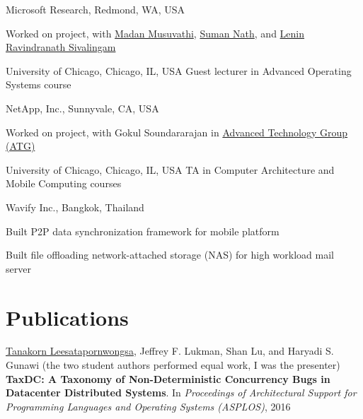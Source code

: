 \documentclass[10pt]{article} %
\begin{document}
{Microsoft Research, Redmond, WA, USA}
{\begin{minipage}{\smallertextwidth}
Worked on  project,
with \href{https://www.microsoft.com/en-us/research/people/madanm/}{Madan Musuvathi}, 
\href{https://www.microsoft.com/en-us/research/people/sumann/}{Suman Nath}, 
and \href{http://people.csail.mit.edu/lenin/}{Lenin Ravindranath Sivalingam}
\end{minipage}} 

{University of Chicago, Chicago, IL, USA}
{Guest lecturer in Advanced Operating Systems course} 

{NetApp, Inc., Sunnyvale, CA, USA}
{\begin{minipage}{\smallertextwidth}
Worked on  project, 
with Gokul Soundararajan
in \href{http://www.netapp.com/us/company/leadership/advanced-technology/}{Advanced Technology Group (ATG)} 
\end{minipage}}

{University of Chicago, Chicago, IL, USA}
{TA in Computer Architecture and Mobile Computing courses} 

{Wavify Inc., Bangkok, Thailand}
{\begin{minipage}{\smallertextwidth}
\begin{itemize-noindent}
\setlength\itemsep{-1ex}
\item Built P2P data synchronization framework for mobile platform
\item Built file offloading network-attached storage (NAS) for high workload mail server
\end{itemize-noindent}
\end{minipage}}


\section{Publications}
\underline{Tanakorn Leesatapornwongsa}, Jeffrey F. Lukman, Shan Lu, and Haryadi
S. Gunawi (the two student authors performed equal work, I was the presenter)
\textbf{TaxDC: A Taxonomy of Non-Deterministic Concurrency Bugs in Datacenter
Distributed Systems}. In \textit{Proceedings of Architectural Support for
Programming Languages and Operating Systems (ASPLOS)}, 2016 
\vspace{2mm}
\end{document}
